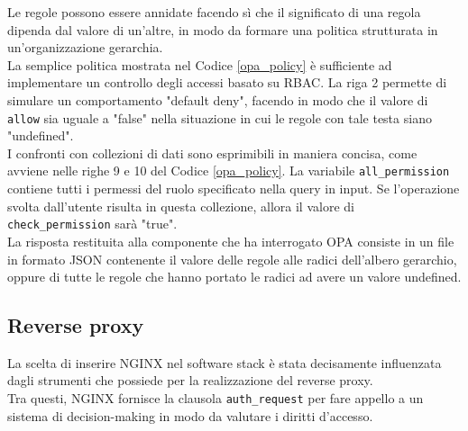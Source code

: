 Le regole possono essere annidate facendo sì che il significato di una regola dipenda dal valore di un'altre, in modo da formare una politica strutturata in un'organizzazione gerarchia. 
\\ La semplice politica mostrata nel Codice \ref*{opa_policy} è sufficiente ad implementare 
un controllo degli accessi basato su RBAC. 
La riga 2 permette di simulare un comportamento "default deny", facendo in modo che il valore di \texttt{allow} sia uguale a "false" 
nella situazione in cui le regole con tale testa siano "undefined".  \\ 
I confronti con collezioni di dati sono esprimibili in maniera concisa, come avviene nelle righe 9 e 10 del Codice \ref*{opa_policy}.
La variabile \texttt{all\_permission} contiene tutti i permessi del ruolo specificato nella query in input. 
Se l'operazione svolta dall'utente risulta in questa collezione, allora il valore di \texttt{check\_permission} sarà "true". 
\\ La risposta restituita alla componente che ha interrogato OPA consiste in un file in formato JSON contenente il valore 
delle regole alle radici dell'albero gerarchio, oppure di tutte le regole che hanno portato le radici ad avere un valore undefined. 


\subsection{Reverse proxy}
La scelta di inserire NGINX nel software stack è stata decisamente influenzata dagli strumenti che possiede per la realizzazione 
del reverse proxy. 
\\ Tra questi, NGINX fornisce la clausola \texttt{auth\_request} per fare appello a un sistema di decision-making in modo da valutare
i diritti d'accesso. 

